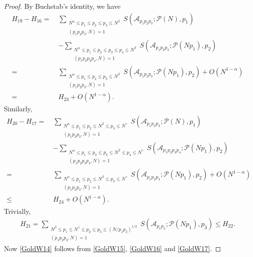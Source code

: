 \documentclass[12pt, a4paper]{amsart}
\def\leq{\leqslant}
\def\le{\leqslant}
\theoremstyle{plain}
\theoremstyle{remark}
\numberwithin{equation}{section}
\begin{document}
\begin{proof}
By Buchstab's identity, we have
\begin{equation}\label{GoldW15}
\begin{split}
H_{19}-H_{16}
=\ &\sum_{\substack{N^\alpha \le p_1 \le p_2 \le p_3\le N^\beta \\ (p_1 p_2 p_3, N) = 1}}  S(\mathscr{A}_{p_1 p_2 p_3}; \mathscr{P}(N), p_1)\\&-\sum_{\substack{N^\alpha \le p_1 \le p_2 \le p_3\le p_4\le N^\beta \\ (p_1 p_2 p_3 p_4, N) = 1}}  S(\mathscr{A}_{p_1 p_2 p_3}; \mathscr{P}(Np_1), p_2)\\
=\ &\sum_{\substack{N^\alpha \le p_1 \le p_2 \le p_3\le N^\beta \\ (p_1 p_2 p_3, N) = 1}}  S(\mathscr{A}_{p_1 p_2 p_3}; \mathscr{P}(Np_1), p_2)+O(N^{1-\alpha})\\
=\ &H_{23}+O(N^{1-\alpha}). 
\end{split}
\end{equation}
Similarly, 
\begin{equation}\label{GoldW16}
\begin{split}
H_{20}-H_{17}
=\ &\sum_{\substack{N^{\alpha} \leq p_1 \le p_2 \le N^{\beta} \leq p_3 \le N^{\gamma}\\ (p_1 p_2 p_3, N) = 1}} S(\mathscr{A}_{p_1 p_2 p_3}; \mathscr{P}(N), p_1)\\&-\sum_{\substack{N^{\alpha} \leq p_1 \le p_2 \le p_3 \le N^{\beta} \leq p_4 \le N^{\gamma} \\ (p_1 p_2 p_3 p_4, N) = 1}} S(\mathscr{A}_{p_1 p_2 p_3 p_4}; \mathscr{P}(Np_1), p_2)\\
=\ &\sum_{\substack{N^{\alpha} \leq p_1 \le p_2 \le N^{\beta} \leq p_3 \le N^{\gamma}\\ (p_1 p_2 p_3, N) = 1}} S(\mathscr{A}_{p_1 p_2 p_3}; \mathscr{P}(Np_1), p_2)+O(N^{1-\alpha})\\
\le \ &H_{24}+O(N^{1-\alpha}). 
\end{split}
\end{equation}
Trivially, 
\begin{equation}\label{GoldW17}
\begin{split}
H_{21}=\sum_{\substack{N^{\beta} \leq p_1 \le N^{\gamma} \leq p_2 \le p_3\le (N/p_1p_2)^{1/2} \\ (p_1 p_2 p_3, N) = 1}} S(\mathscr{A}_{p_1 p_2}; \mathscr{P}(N p_1), p_3)\le H_{22}. 
\end{split}
\end{equation}
Now \eqref{GoldW14} follows from \eqref{GoldW15}, \eqref{GoldW16} and \eqref{GoldW17}.
\end{proof}
	
\end{document}
